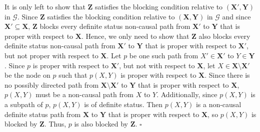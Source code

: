 \documentclass[11pt,a4paper]{article}
\newenvironment{proofof}[1][]{\begin{trivlist}
   \item[\hskip \labelsep {\bfseries Proof of #1.}]}{\hfill{}$\square$\end{trivlist}}
\newcommand{\blck}{the blocking condition\xspace}
\newcommand{\g}[1][G]{\mathcal{#1}}
\begin{document}
\begin{proofof}[Theorem~\ref{thm:preprocessing}]
It is only left to show that $\mathbf{Z}$ satisfies \blck{} relative to $\mathbf{(X',Y)}$ in $\g$. Since $\mathbf{Z}$ satisfies \blck{} relative to $\mathbf{(X,Y)}$ in $\g$ and since $\mathbf{X'} \subseteq \mathbf{X}$, $\mathbf{Z}$ blocks every definite status non-causal path from $\mathbf{X'}$ to $\mathbf{Y}$ that is proper with respect to $\mathbf{X}$. Hence, we only need to show that $\mathbf{Z}$ also blocks every definite status non-causal path from $\mathbf{X'}$ to $\mathbf{Y}$ that is proper with respect to $\mathbf{X'}$, but not proper with respect to $\mathbf{X}$.
Let $p$ be one such path from $X' \in \mathbf{X'}$ to $Y \in \mathbf{Y}$. Since $p$ is proper with respect to $\mathbf{X'}$, but not with respect to $\mathbf{X}$, let $X \in \mathbf{X} \setminus \mathbf{X'}$ be the node on $p$ such that $p(X,Y)$ is proper with respect to $\mathbf{X}$. Since there is no possibly directed path from $\mathbf{X} \setminus \mathbf{X'}$ to $\mathbf{Y}$ that is proper with respect to $\mathbf{X}$, $p(X,Y)$ must be a non-causal path from $X$ to $Y$. Additionally, since $p(X,Y)$ is a subpath of $p$, $p(X,Y)$ is of definite status. Then $p(X,Y)$ is a non-causal definite status path from $\mathbf{X}$ to $\mathbf{Y}$ that is proper with respect to $\mathbf{X}$, so $p(X,Y)$ is blocked by $\mathbf{Z}$. Thus, $p$ is also blocked by $\mathbf{Z}$.
\end{proofof}
\end{document}
